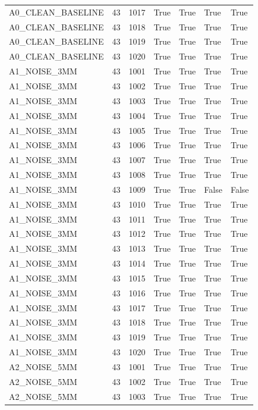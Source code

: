 \documentclass[11pt,a4paper,oneside]{book}
\begin{document}
\begin{longtable}{l l l l l l l}
A0\_CLEAN\_BASELINE & 43 & 1017 & True & True & True & True \\
A0\_CLEAN\_BASELINE & 43 & 1018 & True & True & True & True \\
A0\_CLEAN\_BASELINE & 43 & 1019 & True & True & True & True \\
A0\_CLEAN\_BASELINE & 43 & 1020 & True & True & True & True \\
A1\_NOISE\_3MM & 43 & 1001 & True & True & True & True \\
A1\_NOISE\_3MM & 43 & 1002 & True & True & True & True \\
A1\_NOISE\_3MM & 43 & 1003 & True & True & True & True \\
A1\_NOISE\_3MM & 43 & 1004 & True & True & True & True \\
A1\_NOISE\_3MM & 43 & 1005 & True & True & True & True \\
A1\_NOISE\_3MM & 43 & 1006 & True & True & True & True \\
A1\_NOISE\_3MM & 43 & 1007 & True & True & True & True \\
A1\_NOISE\_3MM & 43 & 1008 & True & True & True & True \\
A1\_NOISE\_3MM & 43 & 1009 & True & True & False & False \\
A1\_NOISE\_3MM & 43 & 1010 & True & True & True & True \\
A1\_NOISE\_3MM & 43 & 1011 & True & True & True & True \\
A1\_NOISE\_3MM & 43 & 1012 & True & True & True & True \\
A1\_NOISE\_3MM & 43 & 1013 & True & True & True & True \\
A1\_NOISE\_3MM & 43 & 1014 & True & True & True & True \\
A1\_NOISE\_3MM & 43 & 1015 & True & True & True & True \\
A1\_NOISE\_3MM & 43 & 1016 & True & True & True & True \\
A1\_NOISE\_3MM & 43 & 1017 & True & True & True & True \\
A1\_NOISE\_3MM & 43 & 1018 & True & True & True & True \\
A1\_NOISE\_3MM & 43 & 1019 & True & True & True & True \\
A1\_NOISE\_3MM & 43 & 1020 & True & True & True & True \\
A2\_NOISE\_5MM & 43 & 1001 & True & True & True & True \\
A2\_NOISE\_5MM & 43 & 1002 & True & True & True & True \\
A2\_NOISE\_5MM & 43 & 1003 & True & True & True & True \\

\end{longtable}
\end{document}
